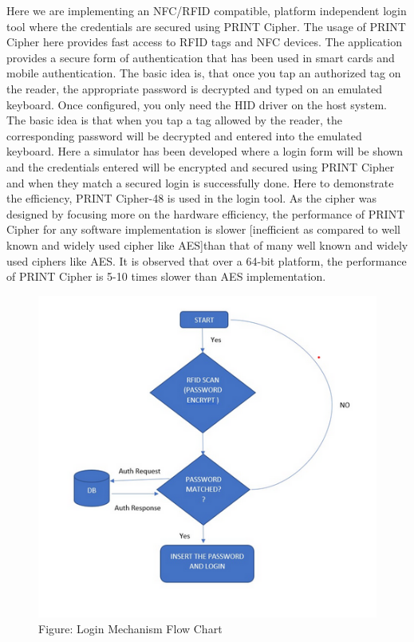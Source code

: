\documentclass[journal=tosc,preprint]{iacrtrans}
\begin{document}
Here we are implementing an NFC/RFID compatible, platform independent login tool where the credentials are secured using PRINT Cipher. The usage of PRINT Cipher here provides fast access to RFID tags and NFC devices. The application provides a secure form of authentication that has been used in smart cards and mobile authentication. The basic idea is, that once you tap an authorized tag on the reader, the appropriate password is decrypted and typed on an emulated keyboard.
Once configured, you only need the HID driver on the host system. The basic idea is that when you tap a tag allowed by the reader, the corresponding password will be decrypted and entered into the emulated keyboard.
Here a simulator has been developed where a login form will be shown and the credentials entered will be encrypted and secured using PRINT Cipher and when they match a secured login is successfully done. Here to demonstrate the efficiency, PRINT Cipher-48 is used in the login tool.
As the cipher was designed by focusing more on the hardware efficiency, the performance of PRINT Cipher for any software implementation is slower [inefficient as compared to well known and widely used cipher like AES]than that of many well known and widely used ciphers like AES. It is observed that over a 64-bit platform, the performance of PRINT Cipher is 5-10 times slower than AES implementation.
\begin{figure}[ht]
	\centering
	\includegraphics{pics/logintool.png}
	\caption{Figure: Login Mechanism Flow Chart}
\end{figure}
\end{document}
